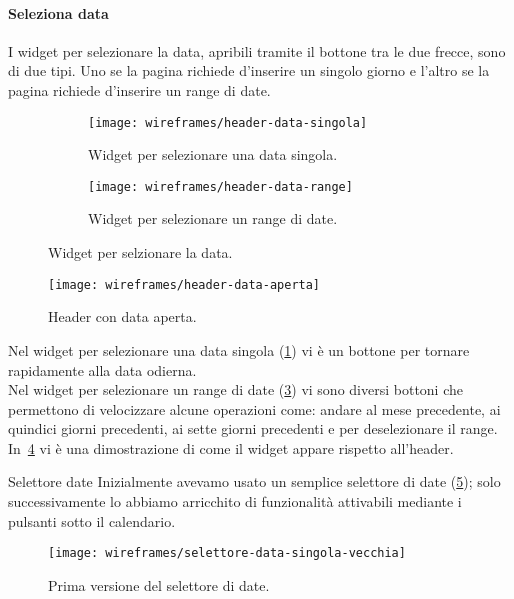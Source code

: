 \paragraph{Seleziona data}
I widget per selezionare la data, apribili tramite il bottone tra le due frecce, sono di due tipi. Uno se la pagina richiede  d'inserire un singolo giorno e l'altro se la pagina richiede d'inserire un range di date.\\

\begin{figure}[H]
    \begin{subfigure}[b]{0.5\textwidth}
        \centering
        \texttt{[image: wireframes/header-data-singola]}
        \caption{Widget per selezionare una data singola.}\label{fig:header-data-singola}
    \end{subfigure}
\hfill
    \begin{subfigure}[b]{0.5\textwidth}
        \centering
        \texttt{[image: wireframes/header-data-range]}
        \caption{Widget per selezionare un range di date.}\label{fig:header-data-range}
    \end{subfigure}
    \caption{Widget per selzionare la data.}
\end{figure}

\begin{figure}[H]
    \centering
    \texttt{[image: wireframes/header-data-aperta]}
    \caption{Header con data aperta.}\label{fig:header-data-aperta}
\end{figure}

Nel widget per selezionare una data singola (\ref{fig:header-data-singola}) vi è un bottone per tornare rapidamente alla data odierna.\\
Nel widget per selezionare un range di date (\ref{fig:header-data-range}) vi sono diversi bottoni che permettono di velocizzare alcune operazioni come: andare al mese precedente, ai quindici giorni precedenti, ai sette giorni precedenti e per deselezionare il range.\\
In~\ref{fig:header-data-aperta} vi è una dimostrazione di come il widget appare rispetto all'header.

\begin{bclogo}{Selettore date}
    Inizialmente avevamo usato un semplice selettore di date (\ref{fig:selettore-data-singola-vecchia}); solo successivamente lo abbiamo arricchito di funzionalità  attivabili mediante i pulsanti sotto il calendario.
\begin{figure}[H]
    \centering
    \texttt{[image: wireframes/selettore-data-singola-vecchia]}
    \caption{Prima versione del selettore di date.}\label{fig:selettore-data-singola-vecchia}
\end{figure}
\end{bclogo}

